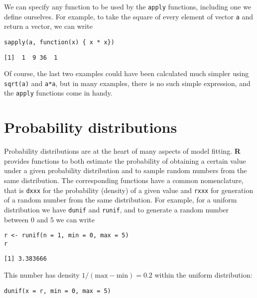 \documentclass[11pt,a4paper]{article}
\begin{document}
We can specify any function to be used by the \texttt{apply} functions, including one we define ourselves. For example, to take the square of every element of vector \texttt{a} and return a vector, we can write \\

\begin{verbatim}
sapply(a, function(x) { x * x})
\end{verbatim}

\begin{verbatim}
[1]  1  9 36  1
\end{verbatim}

Of course, the last two examples could have been calculated much simpler using \texttt{sqrt(a)} and \texttt{a*a}, but in many examples, there is no such simple expression, and the \texttt{apply} functions come in handy. \\

\section{Probability distributions}
\label{sec-5}

Probability distributions are at the heart of many aspects of model fitting. \textbf{R} provides functions to both estimate the probability of obtaining a certain value under a given probability distribution and to sample random numbers from the same distribution. The corresponding functions have a common nomenclature, that is \verb~dxxx~ for the probability (density) of a given value and \verb~rxxx~ for generation of a random number from the same distribution. For example, for a uniform distribution we have \verb~dunif~ and \verb~runif~, and to generate a random number between 0 and 5 we can write \\

\begin{verbatim}
r <- runif(n = 1, min = 0, max = 5)
r
\end{verbatim}

\begin{verbatim}
[1] 3.383666
\end{verbatim}

This number has density $1/(\mathrm{max}-\mathrm{min})=0.2$ within the uniform distribution: \\

\begin{verbatim}
dunif(x = r, min = 0, max = 5)
\end{verbatim}
\end{document}
